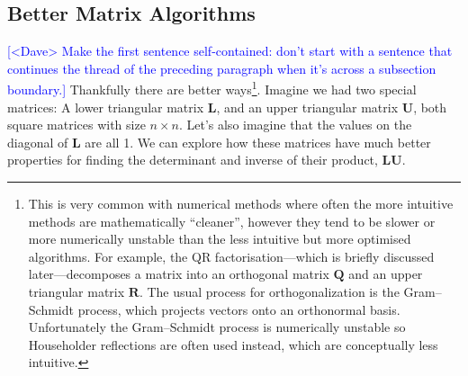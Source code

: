 \documentclass[12pt]{article}
\newcommand{\note}[2][red]{\textcolor{#1}{#2}}
\newcommand{\notedme}[1]{\note[blue]{[<Dave> #1]}}
\begin{document}
\subsection{Better Matrix Algorithms}
\label{lu}

\notedme{Make the first sentence self-contained: don't start with a sentence that continues the thread of the preceding paragraph when it's across a subsection boundary.}
Thankfully there are better ways\footnote{This is very common with numerical methods where often the more intuitive methods are mathematically ``cleaner'', however they tend to be slower or more numerically unstable than the less intuitive but more optimised algorithms. For example, the QR factorisation---which is briefly discussed later---decomposes a matrix into an orthogonal matrix $\mathbf{Q}$ and an upper triangular matrix $\mathbf{R}$. The usual process for orthogonalization is the Gram–Schmidt process, which projects vectors onto an orthonormal basis. Unfortunately the Gram–Schmidt process is numerically unstable so Householder reflections are often used instead, which are conceptually less intuitive.}. Imagine we had two special matrices: A lower triangular matrix $\mathbf{L}$, and an upper triangular matrix $\mathbf{U}$, both square matrices with size $n \times n$. Let's also imagine that the values on the diagonal of $\mathbf{L}$ are all 1. We can explore how these matrices have much better properties for finding the determinant and inverse of their product, $\mathbf{LU}$.
\end{document}
